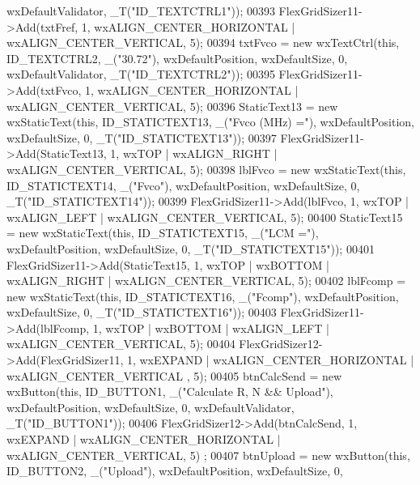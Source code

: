 \begin{DoxyCode}
      wxDefaultValidator, _T(\textcolor{stringliteral}{"ID\_TEXTCTRL1"}));
00393     FlexGridSizer11->Add(txtFref, 1, wxALIGN\_CENTER\_HORIZONTAL | wxALIGN\_CENTER\_VERTICAL, 5);
00394     txtFvco = \textcolor{keyword}{new} wxTextCtrl(\textcolor{keyword}{this}, ID\_TEXTCTRL2, \_(\textcolor{stringliteral}{"30.72"}), wxDefaultPosition, wxDefaultSize, 0, 
      wxDefaultValidator, _T(\textcolor{stringliteral}{"ID\_TEXTCTRL2"}));
00395     FlexGridSizer11->Add(txtFvco, 1, wxALIGN\_CENTER\_HORIZONTAL | wxALIGN\_CENTER\_VERTICAL, 5);
00396     StaticText13 = \textcolor{keyword}{new} wxStaticText(\textcolor{keyword}{this}, ID\_STATICTEXT13, \_(\textcolor{stringliteral}{"Fvco (MHz) ="}), wxDefaultPosition, 
      wxDefaultSize, 0, _T(\textcolor{stringliteral}{"ID\_STATICTEXT13"}));
00397     FlexGridSizer11->Add(StaticText13, 1, wxTOP | wxALIGN\_RIGHT | wxALIGN\_CENTER\_VERTICAL, 5);
00398     lblFvco = \textcolor{keyword}{new} wxStaticText(\textcolor{keyword}{this}, ID\_STATICTEXT14, \_(\textcolor{stringliteral}{"Fvco"}), wxDefaultPosition, wxDefaultSize, 0, 
      _T(\textcolor{stringliteral}{"ID\_STATICTEXT14"}));
00399     FlexGridSizer11->Add(lblFvco, 1, wxTOP | wxALIGN\_LEFT | wxALIGN\_CENTER\_VERTICAL, 5);
00400     StaticText15 = \textcolor{keyword}{new} wxStaticText(\textcolor{keyword}{this}, ID\_STATICTEXT15, \_(\textcolor{stringliteral}{"LCM ="}), wxDefaultPosition, wxDefaultSize, 0,
       _T(\textcolor{stringliteral}{"ID\_STATICTEXT15"}));
00401     FlexGridSizer11->Add(StaticText15, 1, wxTOP | wxBOTTOM | wxALIGN\_RIGHT | wxALIGN\_CENTER\_VERTICAL, 5);
00402     lblFcomp = \textcolor{keyword}{new} wxStaticText(\textcolor{keyword}{this}, ID\_STATICTEXT16, \_(\textcolor{stringliteral}{"Fcomp"}), wxDefaultPosition, wxDefaultSize, 0, 
      _T(\textcolor{stringliteral}{"ID\_STATICTEXT16"}));
00403     FlexGridSizer11->Add(lblFcomp, 1, wxTOP | wxBOTTOM | wxALIGN\_LEFT | wxALIGN\_CENTER\_VERTICAL, 5);
00404     FlexGridSizer12->Add(FlexGridSizer11, 1, wxEXPAND | wxALIGN\_CENTER\_HORIZONTAL | wxALIGN\_CENTER\_VERTICAL
      , 5);
00405     btnCalcSend = \textcolor{keyword}{new} wxButton(\textcolor{keyword}{this}, ID\_BUTTON1, \_(\textcolor{stringliteral}{"Calculate R, N && Upload"}), wxDefaultPosition, 
      wxDefaultSize, 0, wxDefaultValidator, _T(\textcolor{stringliteral}{"ID\_BUTTON1"}));
00406     FlexGridSizer12->Add(btnCalcSend, 1, wxEXPAND | wxALIGN\_CENTER\_HORIZONTAL | wxALIGN\_CENTER\_VERTICAL, 5)
      ;
00407     btnUpload = \textcolor{keyword}{new} wxButton(\textcolor{keyword}{this}, ID\_BUTTON2, \_(\textcolor{stringliteral}{"Upload"}), wxDefaultPosition, wxDefaultSize, 0, 

\end{DoxyCode}
